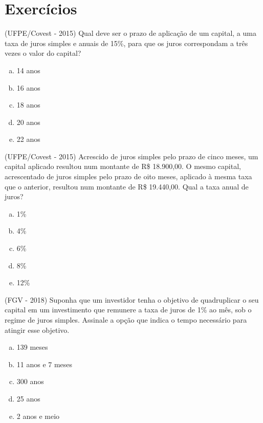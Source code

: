 \section{Exercícios}
 
 \begin{exer}
 
  (UFPE/Covest - 2015) Qual deve ser o prazo de aplicação de um capital, a uma taxa de juros simples e anuais de 15\%, para que os juros correspondam a três vezes o valor do capital?
  \begin{enumerate}[a)]
  \item 14 anos
  \item 16 anos
  \item 18 anos
  \item 20 anos
  \item 22 anos
  \end{enumerate}
  \end{exer}
  
  \begin{exer}
  (UFPE/Covest - 2015) Acrescido de juros simples pelo prazo de cinco meses, um capital aplicado resultou num montante de R\$ 18.900,00. O mesmo capital, acrescentado de juros simples pelo prazo de oito meses, aplicado à mesma taxa que o anterior, resultou num montante de R\$ 19.440,00. Qual a taxa anual de juros?
  \begin{enumerate}[a)]
  \item 1\%
  \item 4\%
  \item 6\%
  \item 8\%
  \item 12\%
  \end{enumerate}
  \end{exer}

  \begin{exer}
  (FGV - 2018) Suponha que um investidor tenha o objetivo de quadruplicar o seu capital em um investimento que remunere a taxa de juros de 1\% ao mês, sob o regime de juros simples. Assinale a opção que indica o tempo necessário para atingir esse objetivo.
  \begin{enumerate}[a)]
  \item 139 meses
  \item 11 anos e 7 meses
  \item 300 anos
  \item 25 anos
  \item 2 anos e meio
  \end{enumerate}
  \end{exer}

